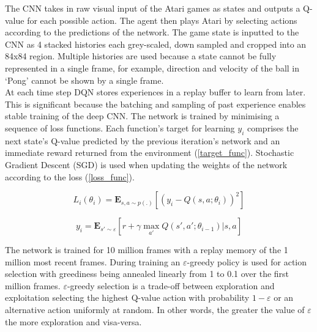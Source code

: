 \documentclass[10pt,journal,compsoc]{IEEEtran}
\begin{document}
The CNN takes in raw visual input of the Atari games as states and outputs a Q-value for each possible action. The agent then plays Atari by selecting actions according to the predictions of the network. The game state is inputted to the CNN as 4 stacked histories each grey-scaled, down sampled and cropped into an 84x84 region. Multiple histories are used because a state cannot be fully represented in a single frame, for example, direction and velocity of the ball in ‘Pong’ cannot be shown by a single frame.
\\
At each time step DQN stores experiences in a replay buffer to learn from later. This is significant because the batching and sampling of past experience enables stable training of the deep CNN. The network is trained by minimising a sequence of loss functions. Each function's target for learning \begin{math}y_i\end{math} comprises the next state's Q-value predicted by the previous iteration’s network and an immediate reward returned from the environment (\ref{target_func}). Stochastic Gradient Descent (SGD) is used when updating the weights of the network according to the loss (\ref{loss_func}).
 
\begin{equation}
\label{loss_func}
L_i(\theta_i) = \mathbf{E}_{s,a\sim p(.)} [(y_i -  Q(s,a;\theta_i))^2]
\end{equation}

\begin{equation}
\label{target_func}
y_i = \mathbf{E}_{s'\sim\varepsilon} [r + \gamma \max_{a'} Q(s',a';\theta_{i-1})|s,a]
\end{equation}

The network is trained for 10 million frames with a replay memory of the 1 million most recent frames. During training an $\varepsilon$-greedy policy is used for action selection with greediness being annealed linearly from 1 to 0.1 over the first million frames. $\varepsilon$-greedy selection is a trade-off between exploration and exploitation selecting the highest Q-value action with probability \begin{math}1-\varepsilon\end{math} or an alternative action uniformly at random. In other words, the greater the value of $\varepsilon$ the more exploration and visa-versa.  

\end{document}
